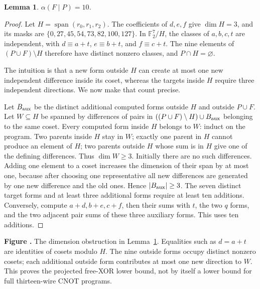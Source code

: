 \documentclass[11pt]{article}
\newtheorem{lemma}[theorem]{Lemma}
\newcommand{\F}{\mathbb F_2}
\newcommand{\spanof}{\operatorname{span}}
\newcommand{\prooffigure}[3]{%
  \begin{center}
  \begin{minipage}{.98\linewidth}
  \centering
  \resizebox{\linewidth}{!}{}\par
  \refstepcounter{figure}\label{#2}%
  \small\textbf{Figure \thefigure.} #3
  \end{minipage}
  \end{center}}
\begin{document}
\begin{lemma}\label{lem:free} $\alpha(F\mid P)=10$.\end{lemma}
\begin{proof}
Let $H=\spanof(r_0,r_1,r_2)$. The coefficients of $d,e,f$ give
$\dim H=3$, and its masks are
$\{0,27,45,54,73,82,100,127\}$.
In $\F^7/H$, the classes of $a,b,c,t$ are independent, with
$d\equiv a+t$, $e\equiv b+t$, and $f\equiv c+t$.
The nine elements of $(P\cup F)\setminus H$ therefore have distinct
nonzero classes, and $P\cap H=\varnothing$.

The intuition is that a new form outside $H$ can create at most one new
independent difference inside its coset, whereas the targets inside $H$
require three independent directions. We now make that count precise.

Let $B_{\rm aux}$ be the distinct additional computed forms outside $H$ and
outside $P\cup F$. Let $W\subseteq H$ be spanned by differences of pairs in
$((P\cup F)\setminus H)\cup B_{\rm aux}$ belonging to the same coset.
Every computed form inside $H$ belongs to $W$: induct on the program.
Two parents inside $H$ stay in $W$; exactly one parent in $H$ cannot
produce an element of $H$; two parents outside $H$ whose sum is in $H$
give one of the defining differences. Thus $\dim W\ge3$.
Initially there are no such differences. Adding one element to a coset
increases the dimension of their span by at most one, because after
choosing one representative all new differences are generated by one
new difference and the old ones. Hence $|B_{\rm aux}|\ge3$.
The seven distinct target forms and at least three additional forms
require at least ten additions. Conversely, compute $a+d,b+e,c+f$,
then their sums with $t$, the two $q$ forms, and the two adjacent pair
sums of these three auxiliary forms. This uses ten additions.
\end{proof}

\prooffigure{quotient_argument}{fig:quotient}{The dimension obstruction
in Lemma~\ref{lem:free}. Equalities such as $d=a+t$ are identities of cosets
modulo $H$. The nine outside forms occupy distinct nonzero cosets;
each additional outside form contributes at most one new direction to $W$.
This proves the projected free-XOR lower bound, not by itself a lower bound
for full thirteen-wire CNOT programs.}
\end{document}
